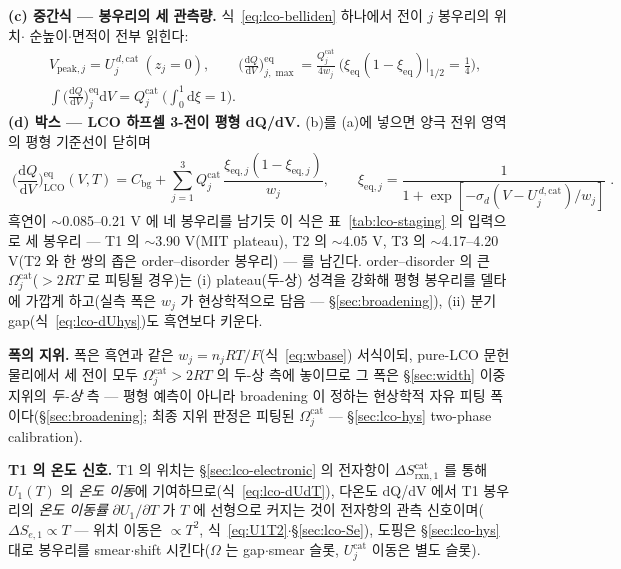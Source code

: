\documentclass[11pt,a4paper]{article}
\newcommand{\dd}{\mathrm{d}}
\newcommand{\eq}{\mathrm{eq}}
\newcommand{\bg}{\mathrm{bg}}
\newcommand{\rxn}{\mathrm{rxn}}
\begin{document}
\textbf{(c) 중간식 — 봉우리의 세 관측량.} 식~\eqref{eq:lco-belliden} 하나에서 전이 $j$ 봉우리의 위치$\cdot$
순높이$\cdot$면적이 전부 읽힌다:
\begin{equation}
\begin{aligned}
&V_{\mathrm{peak},j}=U_j^{\,d,\mathrm{cat}}\ (z_j{=}0),\qquad
\Big(\frac{\dd Q}{\dd V}\Big)^{\eq}_{j,\max}=\frac{Q_j^\mathrm{cat}}{4w_j}\ \Big(\xi_\eq(1{-}\xi_\eq)\big|_{1/2}{=}\tfrac14\Big),\\
&\int\Big(\frac{\dd Q}{\dd V}\Big)^{\eq}_{j}\dd V=Q_j^\mathrm{cat}\ \Big(\textstyle\int_0^1\dd\xi=1\Big).
\end{aligned}
\label{eq:lco-peakobs}
\end{equation}
\textbf{(d) 박스 — LCO 하프셀 3-전이 평형 dQ/dV.} (b)를 (a)에 넣으면 양극 전위 영역의 평형 기준선이 닫히며
\begin{equation}
\boxed{\;\Big(\frac{\dd Q}{\dd V}\Big)^{\eq}_\mathrm{LCO}(V,T)
=C_\bg+\sum_{j=1}^{3}Q_j^\mathrm{cat}\,
\frac{\xi_{\eq,j}(1-\xi_{\eq,j})}{w_j},
\qquad \xi_{\eq,j}=\frac{1}{1+\exp[-\sigma_d(V-U_j^{\,d,\mathrm{cat}})/w_j]}\;.}
\label{eq:lco-eqpeak}
\end{equation}
흑연이 $\sim$0.085--0.21 V 에 네 봉우리를 남기듯 이 식은 표~\ref{tab:lco-staging} 의 입력으로 세 봉우리 —
T1 의 $\sim$3.90 V(MIT plateau), T2 의 $\sim$4.05 V, T3 의 $\sim$4.17--4.20 V(T2 와 한 쌍의 좁은
order--disorder 봉우리) — 를 남긴다. order--disorder 의 큰 $\Omega_j^\mathrm{cat}$($>2RT$ 로 피팅될 경우)는
(i) plateau(두-상) 성격을 강화해 평형 봉우리를 델타에 가깝게 하고(실측 폭은 $w_j$ 가 현상학적으로 담음 —
\S\ref{sec:broadening}), (ii) 분기 gap(식~\eqref{eq:lco-dUhys})도 흑연보다 키운다.

\textbf{폭의 지위.} 폭은 흑연과 같은 $w_j=n_jRT/F$(식~\eqref{eq:wbase}) 서식이되, pure-LCO 문헌 물리에서 세
전이 모두 $\Omega_j^\mathrm{cat}>2RT$ 의 두-상 측에 놓이므로 그 폭은 \S\ref{sec:width} 이중지위의
\emph{두-상} 측 — 평형 예측이 아니라 broadening 이 정하는 현상학적 자유 피팅 폭이다(\S\ref{sec:broadening};
최종 지위 판정은 피팅된 $\Omega_j^\mathrm{cat}$ — \S\ref{sec:lco-hys} two-phase calibration).

\textbf{T1 의 온도 신호.} T1 의 위치는 \S\ref{sec:lco-electronic} 의 전자항이 $\Delta S_{\rxn,1}^\mathrm{cat}$ 를 통해 $U_1(T)$ 의
\emph{온도 이동}에 기여하므로(식~\eqref{eq:lco-dUdT}), 다온도 dQ/dV 에서 T1 봉우리의 \emph{온도 이동률}
$\partial U_1/\partial T$ 가 $T$ 에 선형으로 커지는 것이 전자항의 관측 신호이며($\Delta S_{e,1}\propto T$ —
위치 이동은 $\propto T^2$, 식~\eqref{eq:U1T2}$\cdot$\S\ref{sec:lco-Se}), 도핑은 \S\ref{sec:lco-hys} 대로 봉우리를 smear$\cdot$shift 시킨다($\Omega$ 는
gap$\cdot$smear 슬롯, $U_j^\mathrm{cat}$ 이동은 별도 슬롯).
\end{document}

